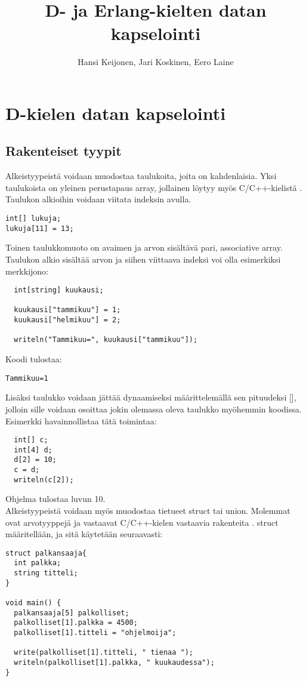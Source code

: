 \documentclass[11pt,oneside,a4paper]{article}
\title{D- ja Erlang-kielten datan kapselointi}
\author{Hansi Keijonen, Jari Koskinen, Eero Laine}
\begin{document}
\maketitle

\newpage

\section{D-kielen datan kapselointi}
\subsection{Rakenteiset tyypit}
Alkeistyypeistä voidaan muodostaa taulukoita, joita on kahdenlaisia. Yksi
taulukoista on yleinen perustapaus array, jollainen löytyy myös C/C++-kielistä
\cite{KRR88}. Taulukon alkioihin voidaan viitata indeksin avulla.
\begin{verbatim}
int[] lukuja;
lukuja[11] = 13;
\end{verbatim}

Toinen taulukkomuoto on avaimen ja arvon sisältävä pari, associative array.
Taulukon alkio sisältää arvon ja siihen viittaava indeksi voi olla esimerkiksi
merkkijono: 
\begin{verbatim}
  int[string] kuukausi;
  
  kuukausi["tammikuu"] = 1;
  kuukausi["helmikuu"] = 2;
  
  writeln("Tammikuu=", kuukausi["tammikuu"]);
\end{verbatim}
Koodi tulostaa:
\begin{verbatim}
Tammikuu=1
\end{verbatim}

Lisäksi taulukko voidaan jättää dynaamiseksi määrittelemällä sen pituudeksi [],
jolloin sille voidaan osoittaa jokin olemassa oleva taulukko myöhemmin koodissa.
Esimerkki havainnollistaa tätä toimintaa:

\begin{verbatim}
  int[] c;
  int[4] d;
  d[2] = 10;
  c = d;
  writeln(c[2]);
\end{verbatim}
Ohjelma tulostaa luvun 10. \\

Alkeistyypeistä voidaan myös muodostaa tietueet struct tai union. Molemmat ovat
arvotyyppejä
\cite{DLA13} ja vastaavat C/C++-kielen vastaavia rakenteita \cite{KRR88}. struct
määritellään, ja sitä käytetään seuraavasti:

\begin{verbatim}
struct palkansaaja{
  int palkka;
  string titteli;
}

void main() {
  palkansaaja[5] palkolliset;
  palkolliset[1].palkka = 4500;
  palkolliset[1].titteli = "ohjelmoija";

  write(palkolliset[1].titteli, " tienaa ");
  writeln(palkolliset[1].palkka, " kuukaudessa");
}
\end{verbatim}
\end{document}

